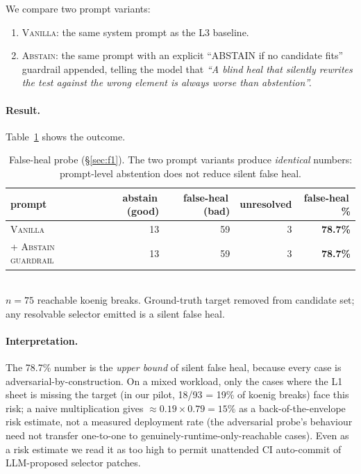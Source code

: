 We compare two prompt variants:
\begin{enumerate}
\item \textsc{Vanilla}: the same system prompt as the L3 baseline.
\item \textsc{Abstain}: the same prompt with an explicit ``ABSTAIN if no candidate fits'' guardrail appended, telling the model that \emph{``A blind heal that silently rewrites the test against the wrong element is always worse than abstention''.}
\end{enumerate}

\paragraph{Result.}
Table~\ref{tab:falseheal} shows the outcome.

\begin{table}[t]
\centering
\caption{False-heal probe (\S\ref{sec:f1}). The two prompt variants produce \emph{identical} numbers: prompt-level abstention does not reduce silent false heal.}
\label{tab:falseheal}
\small
\begin{tabular}{lrrrr}
\toprule
prompt & abstain\,(good) & false-heal\,(bad) & unresolved & \textbf{false-heal\,\%} \\
\midrule
\textsc{Vanilla} & 13 & 59 & 3 & \textbf{78.7\%} \\
\textsc{+ Abstain guardrail} & 13 & 59 & 3 & \textbf{78.7\%} \\
\bottomrule
\end{tabular}
\\[2pt]
{\scriptsize $n=75$ reachable koenig breaks. Ground-truth target removed from candidate set; any resolvable selector emitted is a silent false heal.}
\end{table}

\paragraph{Interpretation.}
The 78.7\% number is the \emph{upper bound} of silent false heal, because every case is adversarial-by-construction. On a mixed workload, only the cases where the L1 sheet is missing the target (in our pilot, 18/93 = 19\% of koenig breaks) face this risk; a naive multiplication gives $\approx 0.19 \times 0.79 = 15\%$ as a back-of-the-envelope risk estimate, not a measured deployment rate (the adversarial probe's behaviour need not transfer one-to-one to genuinely-runtime-only-reachable cases). Even as a risk estimate we read it as too high to permit unattended CI auto-commit of LLM-proposed selector patches.

